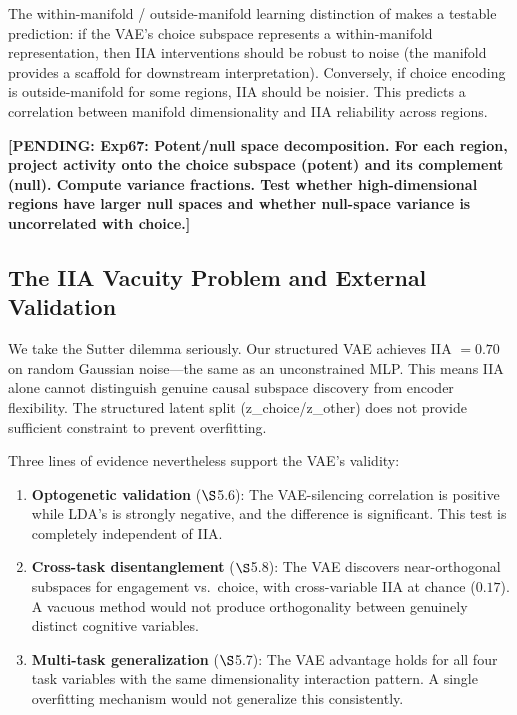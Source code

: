 \documentclass{article}
\newcommand{\pending}[1]{\textcolor{red!70!black}{\textbf{[PENDING: #1]}}}
\begin{document}
The within-manifold / outside-manifold learning distinction of \citet{sadtler2014neural} makes a testable prediction: if the VAE's choice subspace represents a within-manifold representation, then IIA interventions should be robust to noise (the manifold provides a scaffold for downstream interpretation). Conversely, if choice encoding is outside-manifold for some regions, IIA should be noisier. This predicts a correlation between manifold dimensionality and IIA reliability across regions.

\pending{Exp67: Potent/null space decomposition. For each region, project activity onto the choice subspace (potent) and its complement (null). Compute variance fractions. Test whether high-dimensional regions have larger null spaces and whether null-space variance is uncorrelated with choice.}

\subsection{The IIA Vacuity Problem and External Validation}

We take the Sutter dilemma seriously. Our structured VAE achieves IIA $= 0.70$ on random Gaussian noise---the same as an unconstrained MLP. This means IIA alone cannot distinguish genuine causal subspace discovery from encoder flexibility. The structured latent split (z\_choice/z\_other) does not provide sufficient constraint to prevent overfitting.

Three lines of evidence nevertheless support the VAE's validity:

\begin{enumerate}
\item \textbf{Optogenetic validation} ($\S$5.6): The VAE-silencing correlation is positive while LDA's is strongly negative, and the difference is significant. This test is completely independent of IIA.
\item \textbf{Cross-task disentanglement} ($\S$5.8): The VAE discovers near-orthogonal subspaces for engagement vs.\ choice, with cross-variable IIA at chance ($0.17$). A vacuous method would not produce orthogonality between genuinely distinct cognitive variables.
\item \textbf{Multi-task generalization} ($\S$5.7): The VAE advantage holds for all four task variables with the same dimensionality interaction pattern. A single overfitting mechanism would not generalize this consistently.
\end{enumerate}
\end{document}
